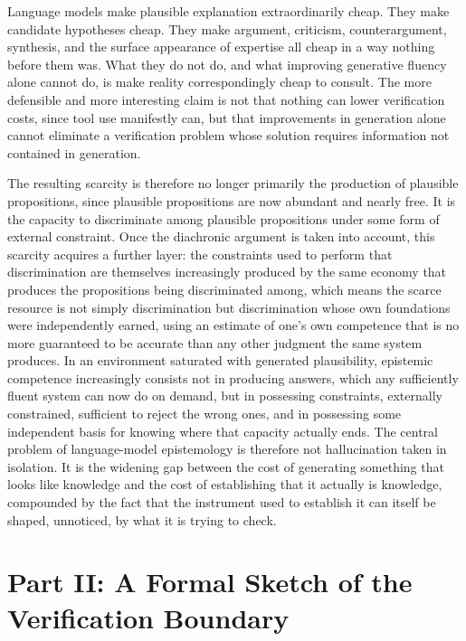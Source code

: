 \documentclass[11pt]{article}
\begin{document}
Language models make plausible explanation extraordinarily cheap. They make candidate hypotheses cheap. They make argument, criticism, counterargument, synthesis, and the surface appearance of expertise all cheap in a way nothing before them was. What they do not do, and what improving generative fluency alone cannot do, is make reality correspondingly cheap to consult. The more defensible and more interesting claim is not that nothing can lower verification costs, since tool use manifestly can, but that improvements in generation alone cannot eliminate a verification problem whose solution requires information not contained in generation.

The resulting scarcity is therefore no longer primarily the production of plausible propositions, since plausible propositions are now abundant and nearly free. It is the capacity to discriminate among plausible propositions under some form of external constraint. Once the diachronic argument is taken into account, this scarcity acquires a further layer: the constraints used to perform that discrimination are themselves increasingly produced by the same economy that produces the propositions being discriminated among, which means the scarce resource is not simply discrimination but discrimination whose own foundations were independently earned, using an estimate of one's own competence that is no more guaranteed to be accurate than any other judgment the same system produces. In an environment saturated with generated plausibility, epistemic competence increasingly consists not in producing answers, which any sufficiently fluent system can now do on demand, but in possessing constraints, externally constrained, sufficient to reject the wrong ones, and in possessing some independent basis for knowing where that capacity actually ends. The central problem of language-model epistemology is therefore not hallucination taken in isolation. It is the widening gap between the cost of generating something that looks like knowledge and the cost of establishing that it actually is knowledge, compounded by the fact that the instrument used to establish it can itself be shaped, unnoticed, by what it is trying to check.

\part*{Part II: A Formal Sketch of the Verification Boundary}
\end{document}
